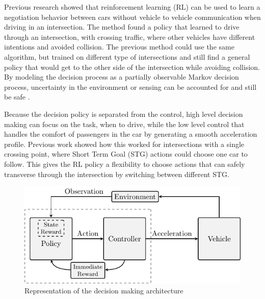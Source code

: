 Previous research \cite{Tram2018} showed that reinforcement learning (RL) can be used to learn a negotiation behavior between cars without vehicle to vehicle communication when driving in an intersection. The method found a policy that learned to drive through an intersection, with crossing traffic, where other vehicles have different intentions and avoided collision. The previous method could use the same algorithm, but trained on different type of intersections and still find a general policy that would get to the other side of the intersection while avoiding collision. 
By modeling the decision process as a partially observable Markov decision process, uncertainty in the environment or sensing can be accounted for \cite{Brechtel2014} and still be safe \cite{BoutonReinforcementDriving}. 

Because the decision policy is separated from the control, high level decision making can focus on the task, when to drive, while the low level control that handles the comfort of passengers in the car by generating a smooth acceleration profile. Previous work showed how this worked for intersections with a single crossing point, where Short Term Goal (STG) actions could choose one car to follow. This gives the RL policy a flexibility to choose actions that can safely transverse through the intersection by switching between different STG. %

\begin{figure}[t!]
	\centering
	\vspace{0.3cm}
	\includegraphics[width=0.8\columnwidth]{figures/figures-architecture.pdf}
	\caption{Representation of the decision making architecture}
	\label{fig:Architecture}
	\vspace{-0.3cm}
\end{figure}

